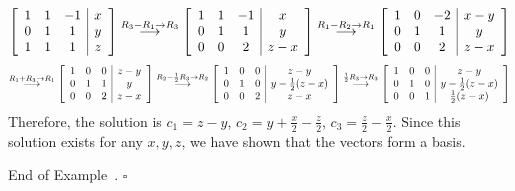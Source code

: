 \documentclass[10pt]{article}
\newenvironment{augmentedmatrix}[1] %
{\left[\begin{array}{#1}}
    {\end{array}\right]}
\theoremstyle{definition}
\newtheorem{example}[theorem]{Example}
\renewenvironment{example}
{\begin{oldexample}}
  {\par\smallskip\hfill   End of Example~\theexample. $\square$    \par\end{oldexample}}
\begin{document}
\begin{example}
  \begin{equation}\label{eq:1}
    \begin{augmentedmatrix}{ccc|c}
      1&1&-1&x\\
      0&1&1&y\\
      1&1&1&z      
    \end{augmentedmatrix}
    \overset{R_{3}-R_{1}\to R_{3}}{\longrightarrow}
    \begin{augmentedmatrix}{ccc|c}
      1&1&-1&x\\
      0&1&1&y\\
      0&0&2&z-x      
    \end{augmentedmatrix}
    \overset{R_{1}-R_{2} \to R_{1}}{\longrightarrow}
    \begin{augmentedmatrix}{ccc|c}
      1&0&-2&x-y\\
      0&1&1&y\\
      0&0&2&z-x      
    \end{augmentedmatrix}
  \end{equation}
  \begin{equation*}
    \overset{R_{1}+R_{3} \to R_{1}}{\longrightarrow}
    \begin{augmentedmatrix}{ccc|c}
      1&0&0&z-y\\
      0&1&1&y\\
      0&0&2&z-x      
    \end{augmentedmatrix}
    \overset{R_{2}-\frac{1}{2}R_{3} \to R_{2}}{\longrightarrow}
    \begin{augmentedmatrix}{ccc|c}
      1&0&0&z-y\\
      0&1&0&y-\frac{1}{2}(z-x)\\
      0&0&2&z-x      
    \end{augmentedmatrix}
    \overset{\frac{1}{2}R_{3} \to R_{3}}{\longrightarrow}
    \begin{augmentedmatrix}{ccc|c}
      1&0&0&z-y\\
      0&1&0&y-\frac{1}{2}(z-x)\\
      0&0&1&\frac{1}{2}(z-x)
    \end{augmentedmatrix}
  \end{equation*}
  Therefore, the solution is $c_{1} =z-y$, $c_{2} =
  y+\frac{x}{2}-\frac{z}{2}$, $c_{3}= \frac{z}{2}-\frac{x}{2}$. Since this
  solution exists for any $x,y,z$, we have shown that the vectors form a basis.
\end{example}
\end{document}
